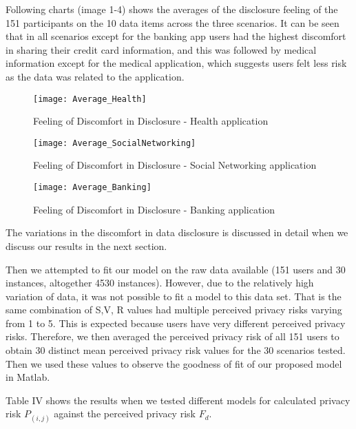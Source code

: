 \documentclass[10pt]{article}
\begin{document}
Following charts (image 1-4) shows the averages of the disclosure feeling of the 151 participants on the 10 data items across the three scenarios. It can be seen that in all scenarios except for the banking app users had the highest discomfort in sharing their credit card information, and this was followed by medical information except for the medical application, which suggests users felt less risk as the data was related to the application.

\begin{figure}[h]
\begin{center}
\texttt{[image: Average\_Health]}
\caption{Feeling of Discomfort in Disclosure - Health  application}
\end{center}
\end{figure}

\begin{figure}[h]
\begin{center}
\texttt{[image: Average\_SocialNetworking]}
\caption{Feeling of Discomfort in Disclosure - Social Networking application}
\end{center}
\end{figure}

\begin{figure}[h]
\begin{center}
\texttt{[image: Average\_Banking]}
\caption{Feeling of Discomfort in Disclosure - Banking application}
\end{center}
\end{figure}

The variations in the discomfort in data disclosure is discussed in detail when we discuss our results in the next section.

Then we attempted to fit our model on the raw data available (151 users and 30 instances, altogether 4530 instances). However, due to the relatively high variation of data, it was not possible to fit a model to this data set. That is the same combination of S,V, R values had multiple perceived privacy risks varying from 1 to 5. This is expected because users have very different perceived privacy risks. Therefore, we then averaged the perceived privacy risk of all 151 users to obtain 30 distinct mean perceived privacy risk values for the 30 scenarios tested. Then we used these values to observe the goodness of fit of our proposed model in Matlab. 

Table IV shows the results when we tested different models for calculated privacy risk $P_{(i,j)}$ against the perceived privacy risk $F_d$. 
\end{document}
